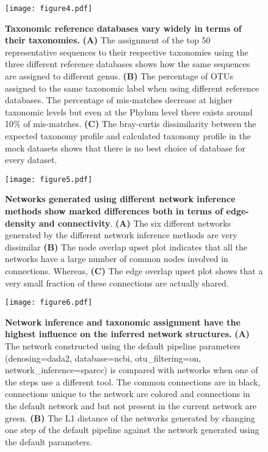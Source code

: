 \begin{figure}[h]
  \centering
  \texttt{[image: figure4.pdf]}
  \caption{
    \textbf{Taxonomic reference databases vary widely in terms of their taxonomies.}
    \textbf{(A)} The assignment of the top 50 representative sequences to their respective taxonomies using the three different reference databases shows how the same sequences are assigned to different genus.
    \textbf{(B)} The percentage of OTUs assigned to the same taxonomic label when using different reference databases.
    The percentage of mis-matches decrease at higher taxonomic levels but even at the Phylum level there exists around 10\% of mis-matches.
    \textbf{(C)} The bray-curtis dissimilarity between the expected taxonomy profile and calculated taxonomy profile in the mock datasets shows that there is no best choice of database for every dataset.
  }
  \label{fig:figure4}
\end{figure}

\begin{figure}[h]
  \centering
  \texttt{[image: figure5.pdf]}
  \caption{
    \textbf{Networks generated using different network inference methods show marked differences both in terms of edge-density and connectivity}.
    \textbf{(A)} The six different networks generated by the different network inference methods are very dissimilar
    \textbf{(B)} The node overlap upset plot indicates that all the networks have a large number of common nodes involved in connections.
    Whereas, \textbf{(C)} The edge overlap upset plot shows that a very small fraction of these connections are actually shared.
  }
  \label{fig:figure6}
\end{figure}

\begin{figure}[h]
  \centering
  \texttt{[image: figure6.pdf]}
  \caption{
    \textbf{Network inference and taxonomic assignment have the highest influence on the inferred network structures.}
    \textbf{(A)} The network constructed using the default pipeline parameters (denosing=dada2, database=ncbi, otu\_filtering=on, network\_inference=sparcc) is compared with networks when one of the steps use a different tool.
    The common connections are in black, connections unique to the network are colored and connections in the default network and but not present in the current network are green.
    \textbf{(B)} The L1 distance of the networks generated by changing one step of the default pipeline against the network generated using the default parameters.
  }
  \label{fig:figure1}
\end{figure}


